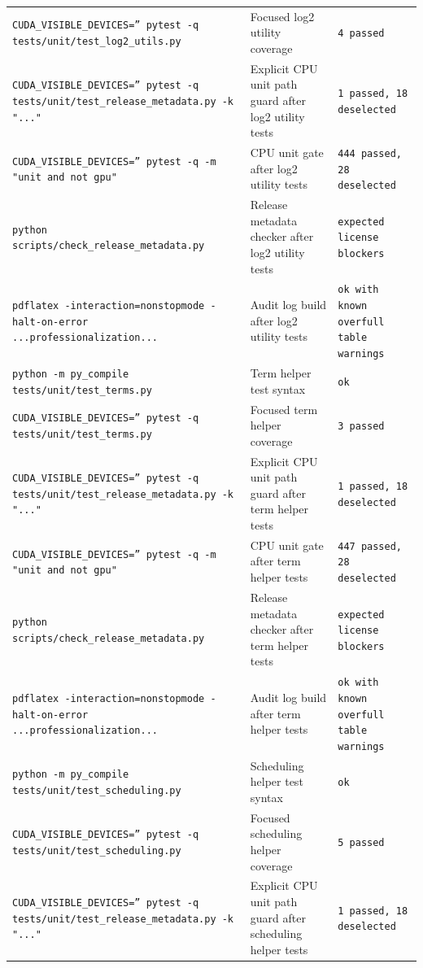\documentclass[11pt]{article}
\begin{document}
\begin{center}
\begin{tabular}{lll}
\texttt{CUDA\_VISIBLE\_DEVICES='' pytest -q tests/unit/test\_log2\_utils.py} &
Focused log2 utility coverage &
\texttt{4 passed} \\
\texttt{CUDA\_VISIBLE\_DEVICES='' pytest -q tests/unit/test\_release\_metadata.py -k "..."} &
Explicit CPU unit path guard after log2 utility tests &
\texttt{1 passed, 18 deselected} \\
\texttt{CUDA\_VISIBLE\_DEVICES='' pytest -q -m "unit and not gpu"} &
CPU unit gate after log2 utility tests &
\texttt{444 passed, 28 deselected} \\
\texttt{python scripts/check\_release\_metadata.py} &
Release metadata checker after log2 utility tests &
\texttt{expected license blockers} \\
\texttt{pdflatex -interaction=nonstopmode -halt-on-error ...professionalization...} &
Audit log build after log2 utility tests &
\texttt{ok with known overfull table warnings} \\
\texttt{python -m py\_compile tests/unit/test\_terms.py} &
Term helper test syntax &
\texttt{ok} \\
\texttt{CUDA\_VISIBLE\_DEVICES='' pytest -q tests/unit/test\_terms.py} &
Focused term helper coverage &
\texttt{3 passed} \\
\texttt{CUDA\_VISIBLE\_DEVICES='' pytest -q tests/unit/test\_release\_metadata.py -k "..."} &
Explicit CPU unit path guard after term helper tests &
\texttt{1 passed, 18 deselected} \\
\texttt{CUDA\_VISIBLE\_DEVICES='' pytest -q -m "unit and not gpu"} &
CPU unit gate after term helper tests &
\texttt{447 passed, 28 deselected} \\
\texttt{python scripts/check\_release\_metadata.py} &
Release metadata checker after term helper tests &
\texttt{expected license blockers} \\
\texttt{pdflatex -interaction=nonstopmode -halt-on-error ...professionalization...} &
Audit log build after term helper tests &
\texttt{ok with known overfull table warnings} \\
\texttt{python -m py\_compile tests/unit/test\_scheduling.py} &
Scheduling helper test syntax &
\texttt{ok} \\
\texttt{CUDA\_VISIBLE\_DEVICES='' pytest -q tests/unit/test\_scheduling.py} &
Focused scheduling helper coverage &
\texttt{5 passed} \\
\texttt{CUDA\_VISIBLE\_DEVICES='' pytest -q tests/unit/test\_release\_metadata.py -k "..."} &
Explicit CPU unit path guard after scheduling helper tests &
\texttt{1 passed, 18 deselected} \\

\end{tabular}
\end{center}
\end{document}
